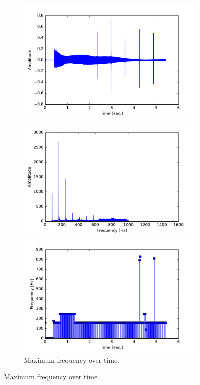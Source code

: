 \begin{figure}[H]
\begin{subfigure}{0.49\textwidth}
\end{subfigure}
\begin{subfigure}{0.49\textwidth}
\centering

\includegraphics[width=\textwidth]{figures/validation/integration/signal_filt.pdf}
\caption{Filtered input signal with noise.}
\label{fig:inte_signal_filt}

\includegraphics[width=\textwidth]{figures/validation/integration/f_signal_filt.pdf}
\caption{Frequency spectrum of filtered signal.}
\label{fig:inte_SIGNAL_filt}

\includegraphics[width=\textwidth]{figures/validation/integration/peak_dec.pdf}
\caption{Maximum frequency over time.}
\label{fig:inte_peak}


\end{subfigure}
\end{figure}
